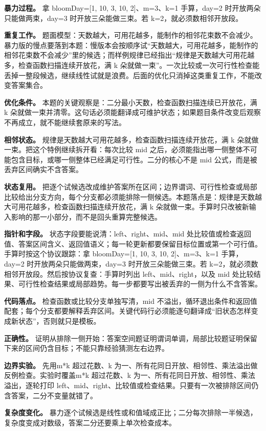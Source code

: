 \textbf{暴力过程。} 拿 bloomDay=[1, 10, 3, 10, 2]、m=3、k=1 手算，day=2 时开放两朵只能做两束，day=3 时开放三朵能做三束。若 k=2，就必须数相邻开放段。

\textbf{重复工作。} 题面模型：天数越大，可用花越多，能制作的相邻花束数不会减少。暴力版的慢点要落到本题：慢版本会按顺序试“天数越大，可用花越多，能制作的相邻花束数不会减少”里的候选；而样例规律已经指出“规律是天数越大可用花越多，检查函数扫描连续开放花，满 k 朵就做一束”。一次比较或一次可行性检查能丢掉一整段候选，继续线性试就是浪费。后面的优化只消掉这类重复工作，不能改变答案集合。

\textbf{优化条件。} 本题的关键观察是：二分最小天数，检查函数扫描连续已开放花，满 k 朵就做一束并清零。这句话必须能翻译成可维护状态；如果题目条件改变后观察不再成立，就不能继续套原来的写法。

\textbf{相邻状态。} 规律是天数越大可用花越多，检查函数扫描连续开放花，满 k 朵就做一束。把这个特例继续拆开看：每次比较 mid 之后，必须能指出哪一侧整体不可能包含目标，或哪一侧整体已经满足可行性。二分的核心不是 mid 公式，而是被丢弃区间确实不含答案。

\textbf{状态复用。} 把逐个试候选改成维护答案所在区间；边界谓词、可行性检查或局部比较给出分支方向，每个分支都必须能排除一侧候选。本题落点是：规律是天数越大可用花越多，检查函数扫描连续开放花，满 k 朵就做一束。手算时只改被新输入影响的那一小部分，而不是回头重算完整候选。

\textbf{指针和字段。} 状态字段要能说清：left、right、mid、mid 处比较值或检查返回值、答案区间含义、返回值语义；每一轮更新都要保留目标位置或第一个可行值。手算时按这个协议跟踪：拿 bloomDay=[1, 10, 3, 10, 2]、m=3、k=1 手算，day=2 时开放两朵只能做两束，day=3 时开放三朵能做三束。若 k=2，就必须数相邻开放段。然后按协议复查：手算时列出 left、mid、right，以及 mid 处比较结果、可行性检查结果或局部趋势。每一步都要写出被丢弃的一侧为什么不含答案。

\textbf{代码落点。} 检查函数或比较分支单独写清，mid 不溢出，循环退出条件和返回值配套；每个分支都要解释丢弃区间。关键代码行必须能逐句翻译成“旧状态怎样变成新状态”，否则就只是模板。

\textbf{正确性。} 证明从排除一侧开始：答案空间题证明谓词单调，局部比较题证明保留下来的区间仍含目标；不能只靠经验猜测左右边界。

\textbf{边界实验。} 先用m*k 超过花数、k 为一、所有花同日开放、相邻性、乘法溢出做反例检查。实验时覆盖m*k 超过花数、k 为一、所有花同日开放、相邻性、乘法溢出，逐轮打印 left、mid、right、比较值或检查结果。只要有一次被排除区间仍含答案，二分不变量就错了。

\textbf{复杂度变化。} 暴力逐个试候选是线性或和值域成正比；二分每次排除一半候选，复杂度变成对数级，答案二分还要乘上单次检查成本。

